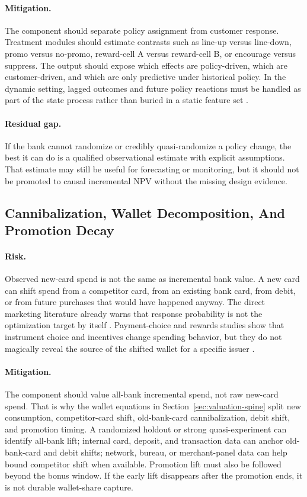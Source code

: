 \documentclass[11pt]{article}
\newcommand{\1}{\mathbf{1}}
\begin{document}
\paragraph{Mitigation.}
The component should separate policy assignment from customer response.
Treatment modules should estimate contrasts such as line-up versus line-down,
promo versus no-promo, reward-cell A versus reward-cell B, or encourage
versus suppress. The output should expose which effects are policy-driven,
which are customer-driven, and which are only predictive under historical
policy. In the dynamic setting, lagged outcomes and future policy reactions
must be handled as part of the state process rather than buried in a static
feature set \citep{arellano1991panel,blundell1998initial,rust1987replacement}.

\paragraph{Residual gap.}
If the bank cannot randomize or credibly quasi-randomize a policy change, the
best it can do is a qualified observational estimate with explicit assumptions.
That estimate may still be useful for forecasting or monitoring, but it should
not be promoted to causal incremental NPV without the missing design evidence.

\subsection{Cannibalization, Wallet Decomposition, And Promotion Decay}

\paragraph{Risk.}
Observed new-card spend is not the same as incremental bank value. A new card
can shift spend from a competitor card, from an existing bank card, from
debit, or from future purchases that would have happened anyway. The direct
marketing literature already warns that response probability is not the
optimization target by itself \citep{bult1995directmail}. Payment-choice and
rewards studies show that instrument choice and incentives change spending
behavior, but they do not magically reveal the source of the shifted wallet
for a specific issuer \citep{koulayev2012payment,agarwal2010rewards,
prelec2001creditcard,gross2001liquidity}.

\paragraph{Mitigation.}
The component should value all-bank incremental spend, not raw new-card spend.
That is why the wallet equations in Section~\ref{sec:valuation-spine} split
new consumption, competitor-card shift, old-bank-card cannibalization, debit
shift, and promotion timing. A randomized holdout or strong quasi-experiment
can identify all-bank lift; internal card, deposit, and transaction data can
anchor old-bank-card and debit shifts; network, bureau, or merchant-panel data
can help bound competitor shift when available. Promotion lift must also be
followed beyond the bonus window. If the early lift disappears after the
promotion ends, it is not durable wallet-share capture.
\end{document}
